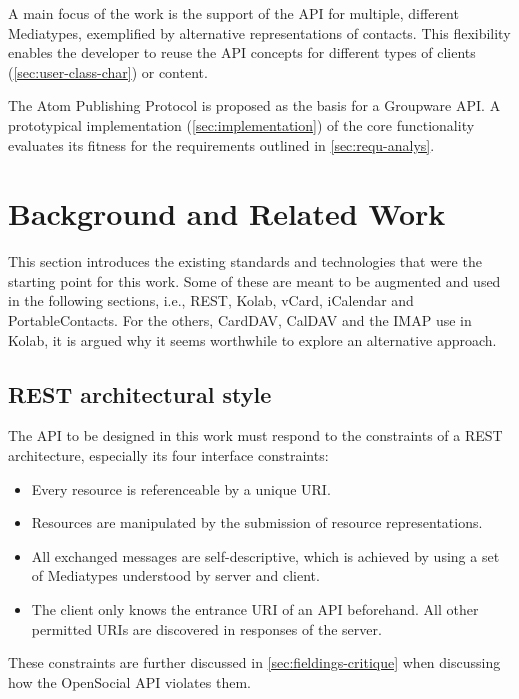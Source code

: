 \documentclass[11pt,a4paper,headsepline,twoside]{scrartcl}		%
\newcommand{\citeurl}[2]{\url{#1} (#2)}
\begin{document}
A main focus of the work is the support of the API for multiple, different
Mediatypes, exemplified by alternative representations of contacts. This
flexibility enables the developer to reuse the API concepts for different types
of clients (\autoref{sec:user-class-char}) or content.

The Atom Publishing Protocol is proposed as the basis for a Groupware API. A
prototypical implementation (\autoref{sec:implementation}) of the core
functionality evaluates its fitness for the requirements outlined in
\autoref{sec:requ-analys}.


\section{Background and Related Work}
\label{sec:backgr-relat-work}

This section introduces the existing standards and technologies that were the
starting point for this work. Some of these are meant to be augmented and used
in the following sections, i.e., REST, Kolab, vCard, iCalendar and
PortableContacts. For the others, CardDAV, CalDAV and the IMAP use in Kolab, it
is argued why it seems worthwhile to explore an alternative approach.

\subsection{REST architectural style}

The API to be designed in this work must respond to the constraints of a REST
architecture, especially its four interface
constraints\cite[sec. 5.1.5]{Fielding2000}:

\begin{itemize}
\item Every resource is referenceable by a unique URI.
\item Resources are manipulated by the submission of resource representations.
\item All exchanged messages are self-descriptive, which is achieved by using a
  set of Mediatypes understood by server and client.
\item The client only knows the entrance URI of an API beforehand. All other
  permitted URIs are discovered in responses of the server.
\end{itemize}

These constraints are further discussed in \autoref{sec:fieldings-critique} when
discussing how the OpenSocial API violates them.
\end{document}
